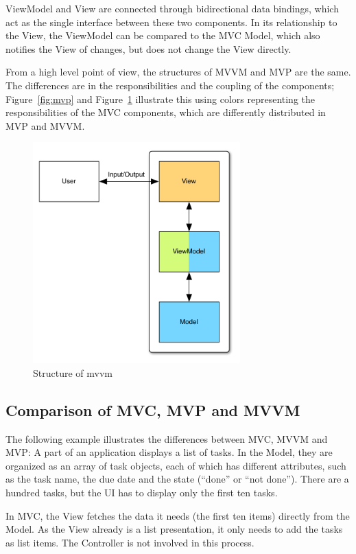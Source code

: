ViewModel and View are connected through bidirectional data bindings, which act as the single interface between these two components. In its relationship to the View, the ViewModel can be compared to the MVC Model, which also notifies the View of changes, but does not change the View directly.

From a high level point of view, the structures of MVVM and MVP are the same. The differences are in the responsibilities and the coupling of the components; Figure~\ref{fig:mvp} and Figure~\ref{fig:mvvm} illustrate this using colors representing the responsibilities of the MVC components, which are differently distributed in MVP and MVVM.

\begin{figure}[H]
	\centering
	\includegraphics[width=8cm]{images/mvvm.pdf}
	\caption{Structure of \acl{mvvm}}
	\label{fig:mvvm}
\end{figure}


\subsection{Comparison of MVC, MVP and MVVM}
The following example illustrates the differences between MVC, MVVM and MVP: A part of an application displays a list of tasks. In the Model, they are organized as an array of task objects, each of which has different attributes, such as the task name, the due date and the state (``done'' or ``not done''). There are a hundred tasks, but the UI has to display only the first ten tasks.

In MVC, the View fetches the data it needs (the first ten items) directly from the Model. As the View already is a list presentation, it only needs to add the tasks as list items. The Controller is not involved in this process.


